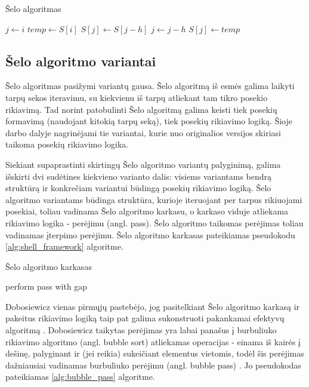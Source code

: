 \documentclass{VUMIFInfBakalaurinis}
\begin{document}
\begin{algorithm}[H]
    \caption{Šelo algoritmas}\label{alg:shellsort}
    \begin{algorithmic}[1]
            \State $j\gets i$
            \State $temp\gets S[i]$
            \Repeat
              \State $S[j]\gets S[j - h]$
              \State $j\gets j-h$
            \State $S[j]\gets temp$
          \EndIf
        \EndFor
      \EndFor
    \end{algorithmic}
  \end{algorithm}

\subsection{Šelo algoritmo variantai}

Šelo algoritmas pasižymi variantų gausa.
Šelo algoritmą iš esmės galima laikyti tarpų sekos iteravimu, su kiekvienu iš tarpų atliekant tam tikro posekio rikiavimą.
Tad norint patobulinti Šelo algoritmą galima keisti tiek posekių formavimą (naudojant kitokią tarpų seką), tiek posekių rikiavimo logiką.
Šioje darbo dalyje nagrinėjami tie variantai, kurie nuo originalios versijos skiriasi taikoma posekių rikiavimo logika.

Siekiant supaprastinti skirtingų Šelo algoritmo variantų palyginimą, galima išskirti dvi sudėtines kiekvieno varianto dalis:
visiems variantams bendrą struktūrą ir konkrečiam variantui būdingą posekių rikiavimo logiką.
Šelo algoritmo variantams būdinga struktūra, kurioje iteruojant per tarpus rikiuojami posekiai, toliau vadinama Šelo algoritmo karkasu,
o karkaso viduje atliekama rikiavimo logika - perėjimu (angl. pass).
Šelo algoritmo taikomas perėjimas toliau vadinamas įterpimo perėjimu.
Šelo algoritmo karkasas pateikiamas pseudokodu \ref{alg:shell_framework} algoritme.

\begin{algorithm}[H]
  \caption{Šelo algoritmo karkasas}\label{alg:shell_framework}
  \begin{algorithmic}[1]
        \State perform pass with gap
    \EndFor
  \end{algorithmic}
\end{algorithm}

Dobosiewicz vienas pirmųjų pastebėjo, jog pasitelkiant
Šelo algoritmo karkasą ir pakeitus rikiavimo logiką taip pat galima sukonstruoti pakankamai efektyvų algoritmą \cite{dobosiewicz1980efficient}.
Dobosiewicz taikytas perėjimas yra labai panašus į burbuliuko rikiavimo algoritmo (angl. bubble sort) atliekamas operacijas -
einama iš kairės į dešinę, palyginant ir (jei reikia) sukeičiant elementus vietomis, todėl
šis perėjimas dažniausiai vadinamas burbuliuko perėjimu (angl. bubble pass) \cite{sedgewick1996analysis}.
Jo pseudokodas pateikiamas \ref{alg:bubble_pass} algoritme.
\end{document}
